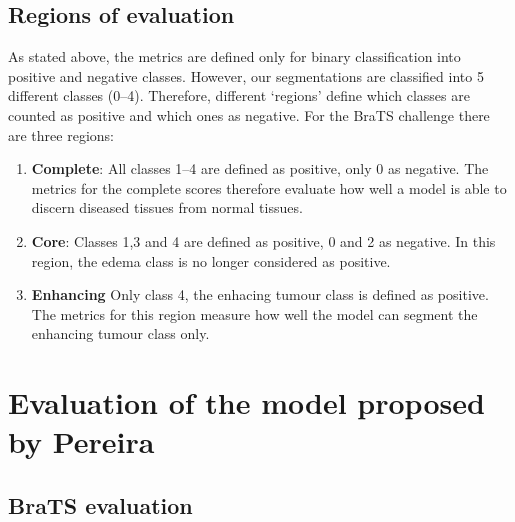 \documentclass[12pt,a4paper,twoside,openright]{report}
\begin{document}
\subsection{Regions of evaluation}
As stated above, the metrics are defined only for binary classification into positive and negative classes. However, our segmentations are classified into 5 different classes (0--4). Therefore, different `regions' define which classes are counted as positive and which ones as negative. For the BraTS challenge there are three regions:
\begin{enumerate}
	\item \textbf{Complete}: All classes 1--4 are defined as positive, only 0 as negative. The metrics for the complete scores therefore evaluate how well a model is able to discern diseased tissues from normal tissues.
	\item \textbf{Core}: Classes 1,3 and 4 are defined as positive, 0 and 2 as negative. In this region, the edema class is no longer considered as positive.
	\item \textbf{Enhancing} Only class 4, the enhacing tumour class is defined as positive. The metrics for this region measure how well the model can segment the enhancing tumour class only.
\end{enumerate}


\section{Evaluation of the model proposed by Pereira}
\subsection{BraTS evaluation}
\end{document}
